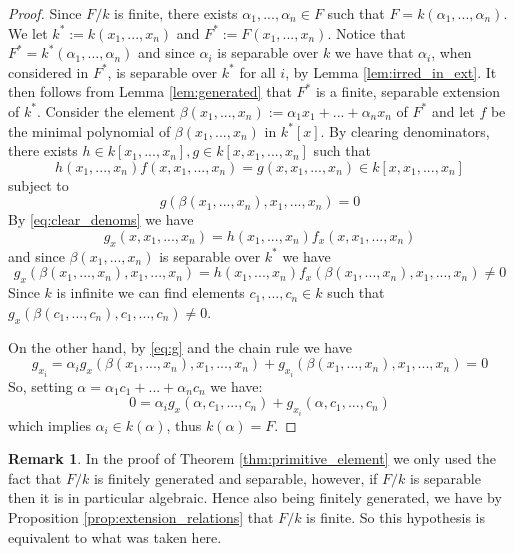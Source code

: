 \documentclass[12pt]{article}
\theoremstyle{plain}
\theoremstyle{definition}
\newtheorem{remark}[thm]{Remark}
\begin{document}
	\begin{proof}
		Since $F/k$ is finite, there exists $\alpha_1,...,\alpha_n \in F$ such that $F = k(\alpha_1,...,\alpha_n)$. We let $k^\ast := k(x_1,...,x_n)$ and $F^\ast := F(x_1,...,x_n)$. Notice that $F^\ast = k^\ast(\alpha_1,...,\alpha_n)$ and since $\alpha_i$ is separable over $k$ we have that $\alpha_i$, when considered in $F^\ast$, is separable over $k^\ast$ for all $i$, by Lemma \ref{lem:irred_in_ext}. It then follows from Lemma \ref{lem:generated} that $F^\ast$ is a finite, separable extension of $k^\ast$. Consider the element $\beta(x_1,...,x_n) := \alpha_1x_1 + ... + \alpha_nx_n$ of $F^\ast$ and let $f$ be the minimal polynomial of $\beta(x_1,...,x_n)$ in $k^\ast[x]$. By clearing denominators, there exists $h \in k[x_1,...,x_n], g\in k[x,x_1,...,x_n]$ such that 
		\begin{equation}
			\label{eq:clear_denoms}
			h(x_1,...,x_n)f(x,x_1,...,x_n) = g(x,x_1,...,x_n) \in k[x,x_1,...,x_n]
		\end{equation}
		subject to 
		\begin{equation}
			\label{eq:g}
			g(\beta(x_1,...,x_n),x_1,...,x_n) = 0
		\end{equation}
		By \eqref{eq:clear_denoms} we have 
		\begin{equation}
			g_x(x,x_1,...,x_n) = h(x_1,...,x_n)f_x(x,x_1,...,x_n)    
		\end{equation}
		and since $\beta(x_1,...,x_n)$ is separable over $k^\ast$ we have
		\begin{equation}
			g_x(\beta(x_1,...,x_n),x_1,...,x_n) = h(x_1,...,x_n)f_x(\beta(x_1,...,x_n),x_1,...,x_n) \neq 0
		\end{equation}
		Since $k$ is infinite we can find elements $c_1,...,c_n \in k$ such that $g_x(\beta(c_1,...,c_n),c_1,...,c_n) \neq 0$.
		
		On the other hand, by \eqref{eq:g} and the chain rule we have
		\begin{equation}
			\label{eq:partials}
			g_{x_i} = \alpha_i g_x(\beta(x_1,...,x_n),x_1,...,x_n) + g_{x_i}(\beta(x_1,...,x_n),x_1,...,x_n) = 0
		\end{equation}
		So, setting $\alpha = \alpha_1 c_1 + ... + \alpha_n c_n$ we have:
		\begin{equation}
			\label{eq:result}
			0 = \alpha_ig_x(\alpha,c_1,...,c_n) + g_{x_i}(\alpha,c_1,...,c_n)
		\end{equation}
		which implies $\alpha_i \in k(\alpha)$, thus $k(\alpha) = F$.
	\end{proof}
	\begin{remark}
		In the proof of Theorem \ref{thm:primitive_element} we only used the fact that $F/k$ is finitely generated and separable, however, if $F/k$ is separable then it is in particular algebraic. Hence also being finitely generated, we have by Proposition \ref{prop:extension_relations} that $F/k$ is finite. So this hypothesis is equivalent to what was taken here.
	\end{remark}
\end{document}
